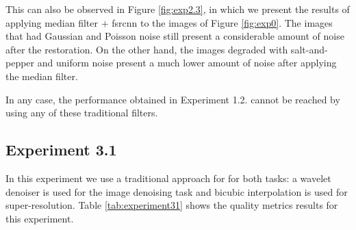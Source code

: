 This can also be observed in Figure \ref{fig:exp2.3}, in which we present the results of applying median filter $+$ \gls{fsrcnn} to the images of Figure \ref{fig:exp0}. The images that had Gaussian and Poisson noise still present a considerable amount of noise after the restoration. On the other hand, the images degraded with salt-and-pepper and uniform noise present a much lower amount of noise after applying the median filter. 

In any case, the performance obtained in Experiment 1.2. cannot be reached by using any of these traditional filters.

\subsection{Experiment 3.1}
In this experiment we use a traditional approach for for both tasks: a wavelet denoiser is used for the image denoising task and bicubic interpolation is used for super-resolution. Table \ref{tab:experiment31} shows the quality metrics results for this experiment.

